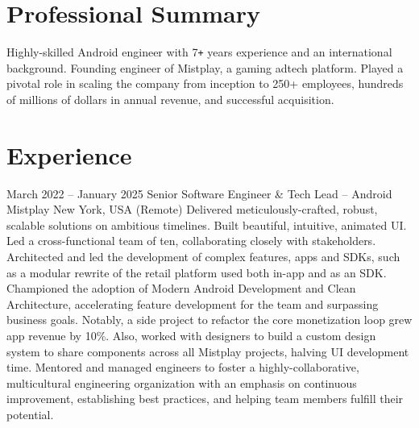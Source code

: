 \documentclass[10pt,a4paper,sans]{moderncv} %
\newcommand{\vs}[0]{\smallskip}
\begin{document}
\makecvtitle %
\vspace{-0.9cm}


\section{Professional Summary}
\vspace{-0.8mm}
Highly-skilled Android engineer with 7\texttt{+} years experience and an international background. Founding engineer of Mistplay, a gaming adtech platform. Played a pivotal role in scaling the company from inception to 250+ employees, hundreds of millions of dollars in annual revenue, and successful acquisition. 


\section{Experience}


\cventry
{March 2022 -- January 2025}
{Senior Software Engineer \& Tech Lead -- Android}
{{Mistplay}}
{New York, USA (Remote)}
{}{
	Delivered meticulously-crafted, robust, scalable solutions on ambitious timelines. Built beautiful, intuitive, animated UI.
	Led a cross-functional team of ten, collaborating closely with stakeholders.
	Architected and led the development of complex features, apps and SDKs, such as a modular rewrite of the retail platform used both in-app and as an SDK.
	Championed the adoption of Modern Android Development and Clean Architecture, accelerating feature development for the team and surpassing business goals. Notably, a side project to refactor the core monetization loop grew app revenue by 10\%. Also, worked with designers to build a custom design system to share components across all Mistplay projects, halving UI development time.
	Mentored and managed engineers to foster a highly-collaborative, multicultural engineering organization with an emphasis on continuous improvement, establishing best practices, and helping team members fulfill their potential.
}\vs
\end{document}
